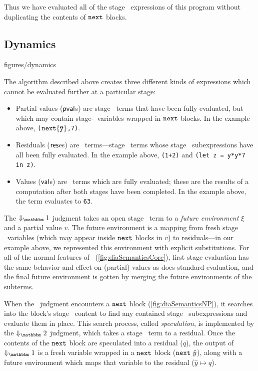 Thus we have evaluated all of the stage \bbone\ expressions of this program without duplicating the contents of ${\tt next}$ blocks.

\subsection{Dynamics}
\label{ssec:dynamics}

 {figures/dynamics}

The algorithm described above creates three different kinds of expressions which
cannot be evaluated further at a particular stage:
\begin{itemize}
\item 
Partial values ($\mathsf{pval}$s) are stage \bbone\ terms that have been fully evaluated, 
but which may contain stage-\bbtwo\ variables wrapped in ${\tt next}$ blocks. 
In the example above, 
\verb|(|${\tt next} \{\mathtt{\hat y}\}$\verb|,7)|.

\item Residuals ($\mathsf{res}$es) are \langTwo\ terms---stage \bbtwo\ terms whose
stage \bbone\ subexpressions have all been fully evaluated. In the example
above,
\verb|(1+2)| and \verb|(let z = y*y*7 in z)|.

\item Values ($\mathsf{val}$s) are \langTwo\ terms which are fully evaluated; these
are the results of a computation after both stages have been completed. In the
example above, the term evaluates to \verb|63|.
\end{itemize}


The $\redonesym$ judgment takes an open stage \bbone\ term to a {\em future
environment} $\xi$ and a partial value $v$.  The future environment is a mapping
from fresh stage \bbtwo\ variables (which may appear inside ${\tt next}$ blocks in
$v$) to residuals---in our example above, we represented this environment with
explicit substitutions. For all of the normal features of \lang\ 
(\ref{fig:diaSemanticsCore}), first stage evaluation has the same behavior and
effect on (partial) values as does standard evaluation, and the final future environment is
gotten by merging the future environments of the subterms.

When the \bbone\ judgment encounters a ${\tt next}$ block (\ref{fig:diaSemanticsNP}), it
searches into the block's stage \bbtwo\ content to find any contained stage
\bbone\ subexpressions and evaluate them in place.  This search process, called
\emph{speculation}, is implemented by the $\redtwosym$ judgment, which takes
a stage \bbtwo\ term to a residual.  Once the contents of the ${\tt next}$ block are
speculated into a residual ($q$), the output of $\redonesym$ is a fresh variable wrapped in a
${\tt next}$ block (${\tt next}~\hat y$), along with a future environment which maps that
variable to the residual ($\hat y \mapsto q$).

